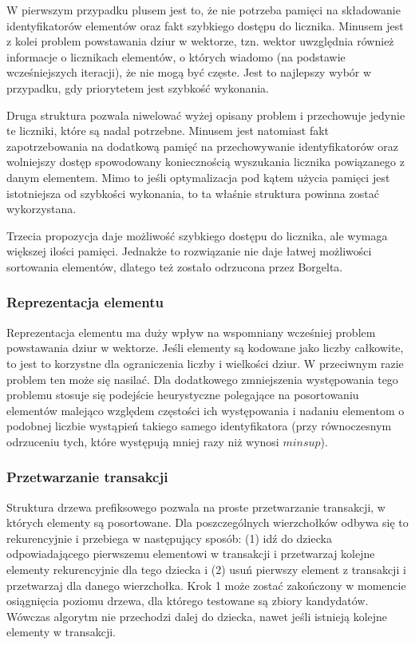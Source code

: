 W pierwszym przypadku plusem jest to, że nie potrzeba pamięci na składowanie identyfikatorów elementów oraz fakt szybkiego dostępu do licznika. Minusem jest z kolei problem powstawania dziur w wektorze, tzn. wektor uwzględnia również informacje o licznikach elementów, o których wiadomo (na podstawie wcześniejszych iteracji), że nie mogą być częste. Jest to najlepszy wybór w przypadku, gdy priorytetem jest szybkość wykonania.

Druga struktura pozwala niwelować wyżej opisany problem i przechowuje jedynie te liczniki, które są nadal potrzebne. Minusem jest natomiast fakt zapotrzebowania na dodatkową pamięć na przechowywanie identyfikatorów oraz wolniejszy dostęp spowodowany koniecznością wyszukania licznika powiązanego z danym elementem. Mimo to jeśli optymalizacja pod kątem użycia pamięci jest istotniejsza od szybkości wykonania, to ta właśnie struktura powinna zostać wykorzystana.

Trzecia propozycja daje możliwość szybkiego dostępu do licznika, ale wymaga większej ilości pamięci. Jednakże to rozwiązanie nie daje łatwej możliwości sortowania elementów, dlatego też zostało odrzucona przez Borgelta.

\subsubsection*{Reprezentacja elementu}
Reprezentacja elementu ma duży wpływ na wspomniany wcześniej problem powstawania dziur w wektorze. Jeśli elementy są kodowane jako liczby całkowite, to jest to korzystne dla ograniczenia liczby i wielkości dziur. W przeciwnym razie problem ten może się nasilać. Dla dodatkowego zmniejszenia występowania tego problemu stosuje się podejście heurystyczne polegające na posortowaniu elementów malejąco względem częstości ich występowania i nadaniu elementom o podobnej liczbie wystąpień takiego samego identyfikatora (przy równoczesnym odrzuceniu tych, które występują mniej razy niż wynosi \(minsup\)). 

\subsubsection*{Przetwarzanie transakcji}
Struktura drzewa prefiksowego pozwala na proste przetwarzanie transakcji, w których elementy są posortowane. Dla poszczególnych wierzchołków odbywa się to rekurencyjnie i przebiega w następujący sposób: (1) idź do dziecka odpowiadającego pierwszemu elementowi w transakcji i przetwarzaj kolejne elementy rekurencyjnie dla tego dziecka i (2) usuń pierwszy element z transakcji i przetwarzaj dla danego wierzchołka. Krok 1 może zostać zakończony w momencie osiągnięcia poziomu drzewa, dla którego testowane są zbiory kandydatów. Wówczas algorytm nie przechodzi dalej do dziecka, nawet jeśli istnieją kolejne elementy w transakcji. 

